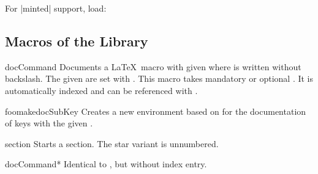 For |minted| \cite{poore:minted} support, load:
\begin{dispListing}
\end{dispListing}


\subsection{Macros of the Library}

\begin{docEnvironment}[doclang/environment content=command description,doc updated=2020-04-22]
    {docCommand}{}
  Documents a \LaTeX\ macro with given  where  is
  written without backslash. The given  are set with .
  This macro takes mandatory or optional .
  It is automatically indexed and can be referenced with
  .
\begin{dispExample}
\begin{docCommand}{foomakedocSubKey}{}
  Creates a new environment  based on  for the
  documentation of keys with the given .
\end{docCommand}
\end{dispExample}
\begin{dispExample}
\begin{docCommand}[doc no index,color definition=blue]{section}%
    {\sarg{}}
  Starts a section. The star variant is unnumbered.
\end{docCommand}
\end{dispExample}
\end{docEnvironment}


\begin{docEnvironment}[doclang/environment content=command description,doc updated=2020-04-22]
    {docCommand*}{}
  Identical to , but without index entry.
\end{docEnvironment}


